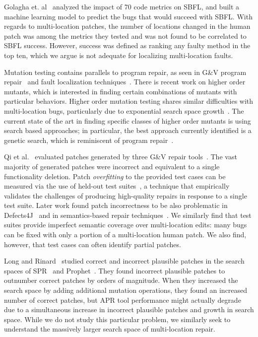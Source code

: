 \documentclass[10pt, conference]{IEEEtran}
\begin{document}
Golagha et. al~\cite{golagha2020can} analyzed the impact of 70 code metrics on SBFL, and built 
a machine learning model to predict the bugs that would succeed with SBFL. With regards to 
multi-location patches, the number of locations changed in the human 
patch was among the metrics they tested and was not found to be correlated to SBFL success. 
However, success was defined as ranking any faulty method in the top ten, which we argue is 
not adequate for localizing multi-location faults. 

Mutation testing contains parallels to program repair, as seen in G\&V
program repair~\cite{weimer2013leveraging} and fault 
localization techniques~\cite{metallaxis,muse,mbfl-survey}. 
There is recent work on higher order mutants, which is interested in finding 
certain combinations of mutants with particular behaviors. Higher order mutation testing 
shares similar difficulties with multi-location bugs, particularly due to 
exponential search space growth~\cite{long-search-spaces}. 
The current state of the art in finding specific classes of 
higher order mutants is using search based approaches; in particular, the best approach 
currently identified is a genetic search, which is reminiscent of program repair~\cite{homs, 
genprog}.

Qi et al.~\cite{patch-correctness} evaluated patches generated 
by three G\&V repair tools~\cite{genprog, ae, rsrepair}. 
The vast majority of generated patches were incorrect and equivalent to 
a single functionality deletion.  Patch \emph{overfitting} to the provided test
cases can be measured via the use of held-out test
suites~\cite{Smith15fse}, a technique that empirically validates the challenges of producing
high-quality repairs in response to a single test suite.   Later work found patch incorrectness to be 
also problematic in Defects4J~\cite{d4j-eval} and in semantics-based 
repair techniques~\cite{Le2018}.  We similarly find that test suites provide
imperfect semantic coverage over multi-location edits: many bugs can be fixed
with only a portion of a multi-location human patch.  We 
also find, however, that test cases can often identify partial patches. 

Long and Rinard~\cite{long-search-spaces} studied
correct and incorrect plausible patches in the search spaces of SPR~\cite{spr} 
and Prophet~\cite{prophet}. They found incorrect plausible patches to outnumber 
correct patches by orders of magnitude. When they increased the search space 
by adding additional mutation operations, they found an increased number of 
correct patches, but APR tool performance might actually degrade due to a 
simultaneous increase in incorrect plausible patches and growth in search space.  
While we do not study this particular problem, 
we similarly seek to understand the 
massively larger search space of multi-location repair. 
\end{document}
